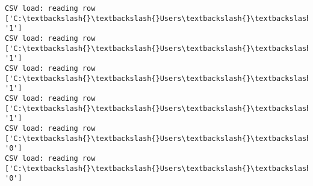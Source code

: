 \documentclass[11pt]{article}
\begin{document}
\begin{Verbatim}[commandchars=\\\{\}]
CSV load: reading row ['C:\textbackslash{}\textbackslash{}Users\textbackslash{}\textbackslash{}AbhishekGangadhar\textbackslash{}\textbackslash{}Downloads\textbackslash{}\textbackslash{}ActionRecog\textbackslash{}\textbackslash{}ActionRecog\textbackslash{}\textbackslash{}DataSets\textbackslash{}\textbackslash{}UCF11\textbackslash{}\textbackslash{}action\_youtube\_naudio\textbackslash{}\textbackslash{}golf\_swing\textbackslash{}\textbackslash{}v\_golf\_24\textbackslash{}\textbackslash{}v\_golf\_24\_04.avi', '1']
CSV load: reading row ['C:\textbackslash{}\textbackslash{}Users\textbackslash{}\textbackslash{}AbhishekGangadhar\textbackslash{}\textbackslash{}Downloads\textbackslash{}\textbackslash{}ActionRecog\textbackslash{}\textbackslash{}ActionRecog\textbackslash{}\textbackslash{}DataSets\textbackslash{}\textbackslash{}UCF11\textbackslash{}\textbackslash{}action\_youtube\_naudio\textbackslash{}\textbackslash{}golf\_swing\textbackslash{}\textbackslash{}v\_golf\_24\textbackslash{}\textbackslash{}v\_golf\_24\_05.avi', '1']
CSV load: reading row ['C:\textbackslash{}\textbackslash{}Users\textbackslash{}\textbackslash{}AbhishekGangadhar\textbackslash{}\textbackslash{}Downloads\textbackslash{}\textbackslash{}ActionRecog\textbackslash{}\textbackslash{}ActionRecog\textbackslash{}\textbackslash{}DataSets\textbackslash{}\textbackslash{}UCF11\textbackslash{}\textbackslash{}action\_youtube\_naudio\textbackslash{}\textbackslash{}golf\_swing\textbackslash{}\textbackslash{}v\_golf\_24\textbackslash{}\textbackslash{}v\_golf\_24\_06.avi', '1']
CSV load: reading row ['C:\textbackslash{}\textbackslash{}Users\textbackslash{}\textbackslash{}AbhishekGangadhar\textbackslash{}\textbackslash{}Downloads\textbackslash{}\textbackslash{}ActionRecog\textbackslash{}\textbackslash{}ActionRecog\textbackslash{}\textbackslash{}DataSets\textbackslash{}\textbackslash{}UCF11\textbackslash{}\textbackslash{}action\_youtube\_naudio\textbackslash{}\textbackslash{}golf\_swing\textbackslash{}\textbackslash{}v\_golf\_24\textbackslash{}\textbackslash{}v\_golf\_24\_07.avi', '1']
CSV load: reading row ['C:\textbackslash{}\textbackslash{}Users\textbackslash{}\textbackslash{}AbhishekGangadhar\textbackslash{}\textbackslash{}Downloads\textbackslash{}\textbackslash{}ActionRecog\textbackslash{}\textbackslash{}ActionRecog\textbackslash{}\textbackslash{}DataSets\textbackslash{}\textbackslash{}UCF11\textbackslash{}\textbackslash{}action\_youtube\_naudio\textbackslash{}\textbackslash{}biking\textbackslash{}\textbackslash{}v\_biking\_03\textbackslash{}\textbackslash{}v\_biking\_03\_01.avi', '0']
CSV load: reading row ['C:\textbackslash{}\textbackslash{}Users\textbackslash{}\textbackslash{}AbhishekGangadhar\textbackslash{}\textbackslash{}Downloads\textbackslash{}\textbackslash{}ActionRecog\textbackslash{}\textbackslash{}ActionRecog\textbackslash{}\textbackslash{}DataSets\textbackslash{}\textbackslash{}UCF11\textbackslash{}\textbackslash{}action\_youtube\_naudio\textbackslash{}\textbackslash{}biking\textbackslash{}\textbackslash{}v\_biking\_03\textbackslash{}\textbackslash{}v\_biking\_03\_02.avi', '0']

\end{Verbatim}
\end{document}
